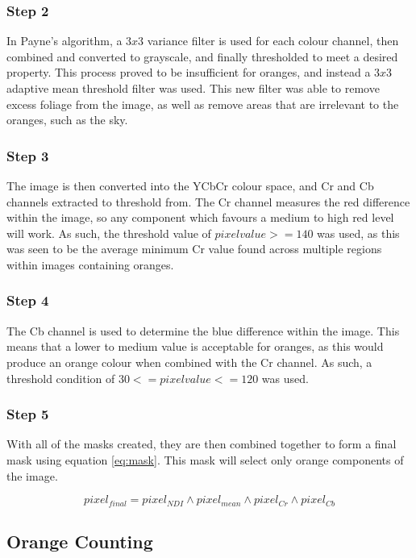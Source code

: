 \documentclass[conference]{IEEEtran}
\begin{document}
\subsubsection{Step 2}
In Payne’s algorithm, a $3x3$ variance filter is used for each colour channel, then combined and converted to grayscale, and finally thresholded to meet a desired property. This process proved to be insufficient for oranges, and instead a $3x3$ adaptive mean threshold filter was used. This new filter was able to remove excess foliage from the image, as well as remove areas that are irrelevant to the oranges, such as the sky.

\subsubsection{Step 3}
The image is then converted into the YCbCr colour space, and Cr and Cb channels extracted to threshold from. The Cr channel measures the red difference within the image, so any component which favours a medium to high red level will work. As such, the threshold value of $pixelvalue >= 140$ was  used, as this was seen to be the average minimum Cr value found across multiple regions within images containing oranges.

\subsubsection{Step 4}

The Cb channel is used to determine the blue difference within the image. This means that a lower to medium value is acceptable for oranges, as this would produce an orange colour when combined with the Cr channel. As such, a threshold condition of $30 <= pixelvalue <= 120$ was used.

\subsubsection{Step 5}

With all of the masks created, they are then combined together to form a final mask using equation \ref{eq:mask}. This mask will select only orange components of the image.

\begin{equation} \label{eq:mask}
pixel_{final}=pixel_{NDI} \land pixel_{mean} \land pixel_{Cr} \land pixel_{Cb} 
\end{equation}

\subsection{Orange Counting} 
\end{document}
